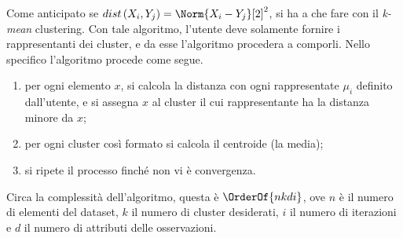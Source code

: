 \documentclass{subfiles}
\begin{document}
Come anticipato se $dist\left(X_{i}, Y_{j}\right) = \Norm{X_{i} - Y_{j}}[2]^{2}$, si ha a che fare con il \emph{k-mean} clustering.
Con tale algoritmo, l'utente deve solamente fornire i rappresentanti dei cluster, e da esse l'algoritmo procedera a comporli.
Nello specifico l'algoritmo procede come segue.
\begin{enumerate}
    \item per ogni elemento $x$, si calcola la distanza con ogni rappresentate $\mu_{i}$ definito dall'utente,
          e si assegna $x$ al cluster il cui rappresentante ha la distanza minore da $x$;
    \item per ogni cluster così formato si calcola il centroide (la media);
    \item si ripete il processo finché non vi è convergenza\footnotemark[2].
\end{enumerate}

Circa la complessità dell'algoritmo, questa è \(\OrderOf{nkdi}\), ove $n$ è il numero di elementi del dataset, $k$ il numero di cluster desiderati,
$i$ il numero di iterazioni e $d$ il numero di attributi delle osservazioni.
\end{document}
